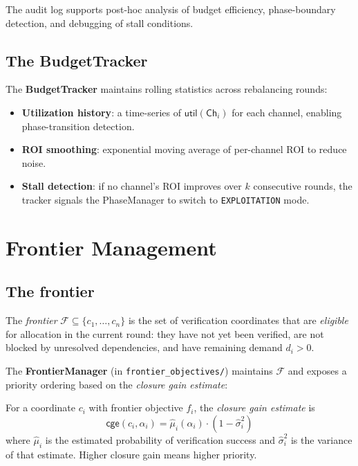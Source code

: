 \documentclass[11pt]{article}
\providecommand{\Chan}{\mathsf{Ch}}            %
\providecommand{\Alloc}{\alpha}                %
\providecommand{\Fron}{\mathcal{F}}            %
\providecommand{\Util}{\mathsf{util}}          %
\begin{document}
The audit log supports post-hoc analysis of budget efficiency,
phase-boundary detection, and debugging of stall conditions.

\subsection{The BudgetTracker}

The \textbf{BudgetTracker} maintains rolling statistics across
rebalancing rounds:

\begin{itemize}
  \item \textbf{Utilization history}: a time-series of $\Util(\Chan_i)$
    for each channel, enabling phase-transition detection.
  \item \textbf{ROI smoothing}: exponential moving average of
    per-channel ROI to reduce noise.
  \item \textbf{Stall detection}: if no channel's ROI improves over
    $k$ consecutive rounds, the tracker signals the PhaseManager
    to switch to \texttt{EXPLOITATION} mode.
\end{itemize}

\section{Frontier Management}\label{sec:frontier}

\subsection{The frontier}

\begin{definition}[Frontier]\label{def:frontier}
The \emph{frontier} $\Fron \subseteq \{c_1, \ldots, c_n\}$ is the
set of verification coordinates that are \emph{eligible} for
allocation in the current round: they have not yet been verified,
are not blocked by unresolved dependencies, and have remaining
demand $d_i > 0$.
\end{definition}

The \textbf{FrontierManager} (in \texttt{frontier\_objectives/}) maintains
$\Fron$ and exposes a priority ordering based on the \emph{closure
gain estimate}:

\begin{definition}\label{def:cge}
For a coordinate $c_i$ with frontier objective $f_i$, the
\emph{closure gain estimate} is
\[
  \mathsf{cge}(c_i, \Alloc_i) =
  \hat{\mu}_i(\Alloc_i) \cdot (1 - \hat{\sigma}_i^2)
\]
where $\hat{\mu}_i$ is the estimated probability of verification
success and $\hat{\sigma}_i^2$ is the variance of that estimate.
Higher closure gain means higher priority.
\end{definition}
\end{document}
